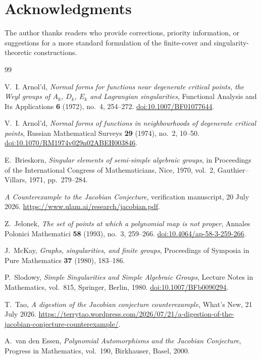 \documentclass[11pt,reqno]{amsart}
\numberwithin{equation}{section}
\theoremstyle{remark}
\begin{document}
\section*{Acknowledgments}
The author thanks readers who provide corrections, priority information, or suggestions for a more standard formulation of the finite-cover and singularity-theoretic constructions.

\begin{thebibliography}{99}


V.~I. Arnol'd,
\emph{Normal forms for functions near degenerate critical points, the Weyl groups of $A_k$, $D_k$, $E_k$ and Lagrangian singularities},
Functional Analysis and Its Applications \textbf{6} (1972), no.~4, 254--272.
\href{https://doi.org/10.1007/BF01077644}{doi:10.1007/BF01077644}.

V.~I. Arnol'd,
\emph{Normal forms of functions in neighbourhoods of degenerate critical points},
Russian Mathematical Surveys \textbf{29} (1974), no.~2, 10--50.
\href{https://doi.org/10.1070/RM1974v029n02ABEH003846}{doi:10.1070/RM1974v029n02ABEH003846}.

E.~Brieskorn,
\emph{Singular elements of semi-simple algebraic groups},
in Proceedings of the International Congress of Mathematicians, Nice, 1970, vol.~2,
Gauthier--Villars, 1971, pp.~279--284.

\emph{A Counterexample to the Jacobian Conjecture},
verification manuscript, 20 July 2026.
\url{https://www.ulam.ai/research/jacobian.pdf}.

Z.~Jelonek,
\emph{The set of points at which a polynomial map is not proper},
Annales Polonici Mathematici \textbf{58} (1993), no.~3, 259--266.
\href{https://doi.org/10.4064/ap-58-3-259-266}{doi:10.4064/ap-58-3-259-266}.

J.~McKay,
\emph{Graphs, singularities, and finite groups},
Proceedings of Symposia in Pure Mathematics \textbf{37} (1980), 183--186.

P.~Slodowy,
\emph{Simple Singularities and Simple Algebraic Groups},
Lecture Notes in Mathematics, vol.~815, Springer, Berlin, 1980.
\href{https://doi.org/10.1007/BFb0090294}{doi:10.1007/BFb0090294}.

T.~Tao,
\emph{A digestion of the Jacobian conjecture counterexample},
What's New, 21 July 2026.
\url{https://terrytao.wordpress.com/2026/07/21/a-digestion-of-the-jacobian-conjecture-counterexample/}.

A.~van den Essen,
\emph{Polynomial Automorphisms and the Jacobian Conjecture},
Progress in Mathematics, vol.~190, Birkhauser, Basel, 2000.

\end{thebibliography}
\end{document}
